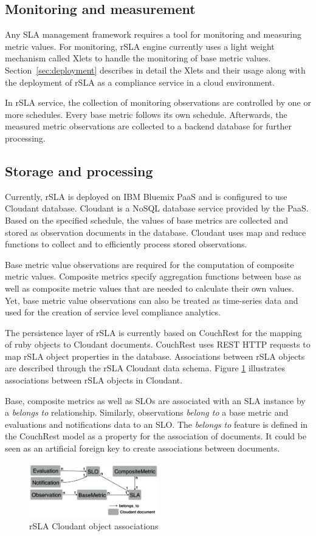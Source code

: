 \subsection{Monitoring and measurement}
Any SLA management framework requires a tool for monitoring and measuring metric values. For monitoring, rSLA engine currently uses a light weight mechanism called Xlets to handle the monitoring of base metric values. Section~\ref{sec:deployment} describes in detail the Xlets and their usage along with the deployment of rSLA as a compliance service in a cloud environment.

In rSLA service, the collection of monitoring observations are controlled by one or more schedules. Every base metric follows its own schedule. Afterwards, the measured metric observations are collected to a backend database for further processing. 
\subsection{Storage and processing}
Currently, rSLA is deployed on IBM Bluemix PaaS \cite{bluemix} and is configured to use Cloudant \cite{cloudant} database. Cloudant is a NoSQL database service provided by the PaaS. Based on the specified schedule, the values of base metrics are collected and stored as observation documents in the database. Cloudant uses map and reduce functions to collect and to efficiently process stored observations. 

Base metric value observations are required for the computation of composite metric values. Composite metrics specify aggregation functions between base as well as composite metric values that are needed to calculate their own values. Yet, base metric value observations can also be treated as time-series data and used for the creation of service level compliance analytics.

The persistence layer of rSLA is currently based on CouchRest \cite{couchrest} for the mapping of ruby objects to Cloudant documents. CouchRest uses REST HTTP requests to map rSLA object properties in 
the database. Associations between rSLA objects are described through the rSLA Cloudant data schema. Figure \ref{schema} illustrates  associations between rSLA objects in Cloudant.

Base, composite metrics as well as SLOs are associated with an SLA instance by a \textit{belongs to} relationship. Similarly, observations \textit{belong to} a base metric and evaluations and notifications data to an SLO. The \textit{belongs to} feature is defined in the CouchRest model as a property for the association of documents. It could be seen as an artificial foreign key to create associations between documents. 
\begin{figure}
\centering
\includegraphics[width=0.5\textwidth]{pics/schema}
\caption{\label{schema} rSLA Cloudant object associations}
\end{figure}


